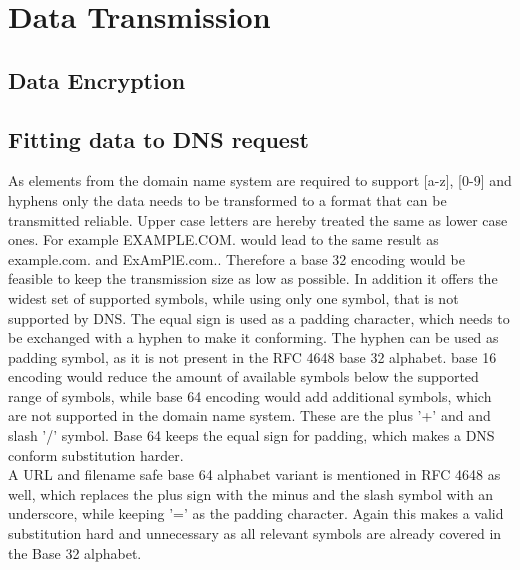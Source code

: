 \newpage



\section{Data Transmission}
\label{sec:software_design:tx}
%
    \subsection{Data Encryption}
        \label{subsec:software_design:encryption}
        

    \subsection{Fitting data to DNS request}
        \label{subsec:software_design:fitting}
        As elements from the domain name system are required to support [a-z], [0-9] and hyphens only the data needs to be transformed to a format that can be transmitted reliable. Upper case letters are hereby treated the same as lower case ones.
        For example EXAMPLE.COM. would lead to the same result as example.com. and ExAmPlE.com..
        Therefore a base 32 encoding would be feasible to keep the transmission size as low as possible. In addition it offers the widest set of supported symbols, while using only one symbol, that is not supported by DNS. The equal sign is used as a padding character, which needs to be exchanged with a hyphen to make it conforming. The hyphen can be used as padding symbol, as it is not present in the RFC 4648 base 32 alphabet\cite{josefsson_simonjosefssonorg_base16_2006}. base 16 encoding would reduce the amount of available symbols below the supported range of symbols, while base 64 encoding would add additional symbols, which are not supported in the domain name system. These are the plus '+' and and slash '/' symbol. Base 64 keeps the equal sign for padding, which makes a DNS conform substitution harder.\\
        A URL and filename safe base 64 alphabet variant is mentioned in RFC 4648 as well, which replaces the plus sign with the minus and the slash symbol with an underscore, while keeping '=' as the padding character. Again this makes a valid substitution hard and unnecessary as all relevant symbols are already covered in the Base 32 alphabet.\\
        
